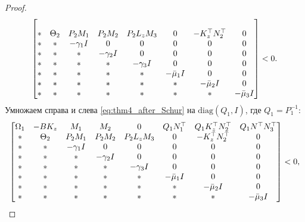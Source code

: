 \begin{proof}
\begin{equation}
\begin{bmatrix}
			\\
			* & {\Theta}_2 & {P}_2{M}_1 & {P}_2{M}_2 & {P}_2{L}_z{M}_3&0& -{K}_z^\top{N}_2^\top& 0\\
			* & * & -\gamma_1{I} & 0&0&0&0&0\\
			* & * & * & -\gamma_2{I}&0&0&0&0\\
			* & * & * & *&-\gamma_3{I}&0&0&0\\
			* & * & * & *&*&-\bar{\mu}_1{I}&0&0\\
			* & * & * & *&*&*&-\bar{\mu}_2{I}&0\\
			*&* & * & * & *&*&*&-\bar{\mu}_3{I}\\
		\end{bmatrix}<0.
	\end{equation}
Умножаем справа и слева \eqref{eq:thm4_after_Schur} на $\text{diag}({Q}_1, {I})$, где ${Q}_1 = {P}_1^{-1}$:
%
\begin{equation}
	\label{eq:thm4_before_Young}
	\begin{bmatrix}
		{\Omega}_1 & -{B}{K}_z & {M}_1 & {M}_2 & 0& {Q}_1{N}_1^\top & {Q}_1{K}_z^\top{N}_2^\top & {Q}_1 {N}^\top{N}_3^\top 
		\\
		* & {\Theta}_2 & {P}_2{M}_1 & {P}_2{M}_2 & {P}_2{L}_z{M}_3 & 0 & -{K}_z^\top{N}_2^\top & 0\\
		* & * & -\gamma_1{I} & 0&0&0&0&0\\
		* & * & * & -\gamma_2{I}&0&0&0&0\\
		* & * & * & *&-\gamma_3{I}&0&0&0\\
		* & * & * & *&*&-\bar{\mu}_1{I}&0&0\\
		* & * & * & *&*&*&-\bar{\mu}_2{I}&0\\
		*&* & * & * & *&*&*&-\bar{\mu}_3{I}
	\end{bmatrix}<0,
\end{equation}


\end{proof}
